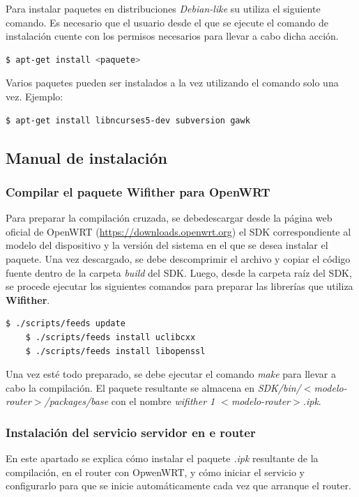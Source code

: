 \documentclass[12pt]{article}
\begin{document}
        Para instalar paquetes en distribuciones \textit{Debian-like} su utiliza el siguiente comando.
        Es necesario que el usuario desde el que se ejecute el comando de instalación cuente con los permisos necesarios para llevar a cabo dicha acción.

        \begin{lstlisting}[language=bash]
    $ apt-get install <paquete>
        \end{lstlisting}

        Varios paquetes pueden ser instalados a la vez utilizando el comando solo una vez.
        Ejemplo:

        \begin{lstlisting}[language=bash]
    $ apt-get install libncurses5-dev subversion gawk
        \end{lstlisting}

    \subsection{Manual de instalación}
        \subsubsection{Compilar el paquete Wifither para OpenWRT}
            Para preparar la compilación cruzada, se debedescargar desde la página web oficial de OpenWRT (\url{https://downloads.openwrt.org}) el SDK correspondiente al modelo del dispositivo y la versión del sistema en el que se desea instalar el paquete. Una vez descargado, se debe descomprimir el archivo y copiar el código fuente dentro de la carpeta \textit{build} del SDK. Luego, desde la carpeta raíz del SDK, se procede ejecutar los siguientes comandos para preparar las librerías que utiliza \textbf{Wifither}.

            \begin{lstlisting}[language=bash]
    $ ./scripts/feeds update
    $ ./scripts/feeds install uclibcxx
    $ ./scripts/feeds install libopenssl
            \end{lstlisting}

            Una vez esté todo preparado, se debe ejecutar el comando \textit{make} para llevar a cabo la compilación. El paquete resultante se almacena en \textit{SDK/bin/$<$modelo-router$>$/packages/base} con el nombre \textit{wifither 1 $<$modelo-router$>$.ipk}.


        \subsubsection{Instalación del servicio servidor en e router}
            En este apartado se explica cómo instalar el paquete \textit{.ipk} resultante de la compilación, en el router con OpwenWRT, y cómo iniciar el servicio y configurarlo para que se inicie automáticamente cada vez que arranque el router.
\end{document}
